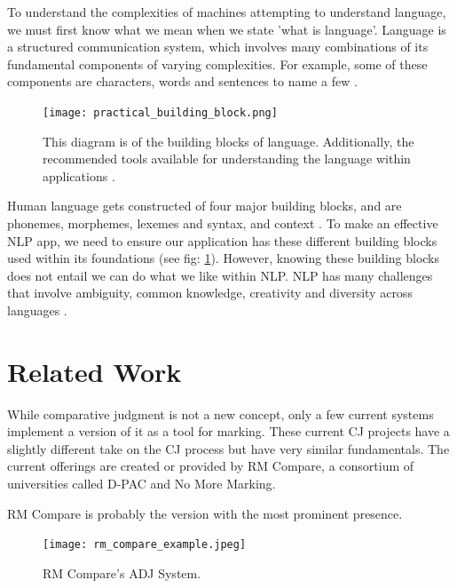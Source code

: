 		To understand the complexities of machines attempting to understand language, we must first know what we mean when we state 'what is language'. Language is a structured communication system, which involves many combinations of its fundamental components of varying complexities. For example, some of these components are characters, words and sentences to name a few \cite{vajjala2020practical}.
		
		\begin{figure}[h]
			\centering
			\texttt{[image: practical\_building\_block.png]}
			\caption{This diagram is of the building blocks of language. Additionally, the recommended tools available for understanding the language within applications \cite{vajjala2020practical}.}
			\label{fig:practical_building_block}
			
		\end{figure} 
		
		Human language gets constructed of four major building blocks, and are phonemes, morphemes, lexemes and syntax, and context \cite{vajjala2020practical}. To make an effective NLP app, we need to ensure our application has these different building blocks used within its foundations (see fig: \ref{fig:practical_building_block}). However, knowing these building blocks does not entail we can do what we like within NLP. NLP has many challenges that involve ambiguity, common knowledge, creativity and diversity across languages \cite{vajjala2020practical}. 
	
	
	
	\section{Related Work}
		\label{sec:google_fu}
		
		While comparative judgment is not a new concept, only a few current systems implement a version of it as a tool for marking. These current CJ projects have a slightly different take on the CJ process but have very similar fundamentals. The current offerings are created or provided by RM Compare, a consortium of universities called D-PAC and No More Marking.
		
		RM Compare is probably the version with the most prominent presence. 
		
		\begin{figure}[h]
			\centering
			\texttt{[image: rm\_compare\_example.jpeg]}
			\caption{RM Compare's ADJ System.}
			\label{fig:rm_compare_ex}
			
		\end{figure}
		
